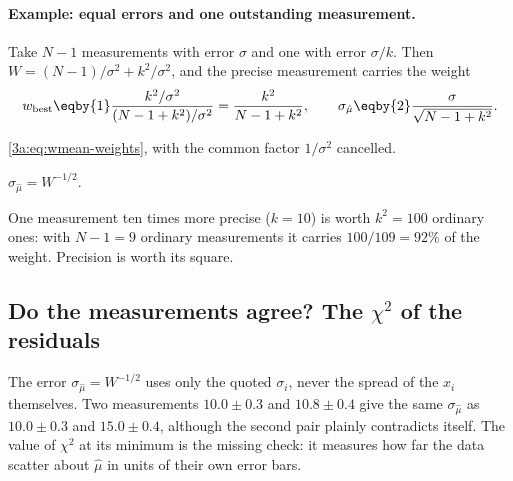 \paragraph{Example: equal errors and one outstanding measurement.}
Take $N-1$ measurements with error $\sigma$ and one with error $\sigma/k$.
Then $W=(N-1)/\sigma^2+k^2/\sigma^2$, and the precise measurement carries the
weight
\begin{equation*}
  w_{\text{best}}\eqby{1}\frac{k^2/\sigma^2}{(N-1+k^2)/\sigma^2}
  =\frac{k^2}{N-1+k^2},
  \qquad
  \sigma_{\hat\mu}\eqby{2}\frac{\sigma}{\sqrt{N-1+k^2}} .
\end{equation*}
\begin{explain}
  \item \eqref{3a:eq:wmean-weights}, with the common factor $1/\sigma^2$ cancelled.
  \item $\sigma_{\hat\mu}=W^{-1/2}$.
\end{explain}
One measurement ten times more precise ($k=10$) is worth $k^2=100$ ordinary
ones: with $N-1=9$ ordinary measurements it carries $100/109=92\%$ of the
weight. Precision is worth its square.

\subsection{Do the measurements agree? The $\chi^2$ of the residuals}
\label{3a:sec:wchi2}

The error $\sigma_{\hat\mu}=W^{-1/2}$ uses only the quoted $\sigma_i$, never
the spread of the $x_i$ themselves. Two measurements $10.0\pm0.3$ and
$10.8\pm0.4$ give the same $\sigma_{\hat\mu}$ as $10.0\pm0.3$ and
$15.0\pm0.4$, although the second pair plainly contradicts itself. The value
of $\chi^2$ at its minimum is the missing check: it measures how far the
data scatter about $\hat\mu$ in units of their own error bars.

